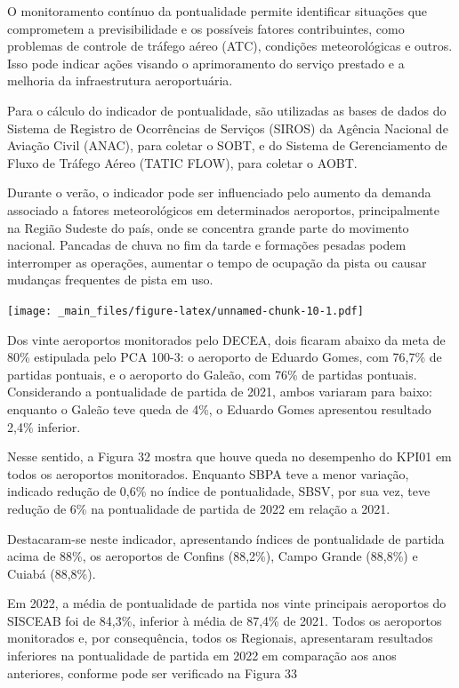 \documentclass[
]{book}
\begin{document}
O monitoramento contínuo da pontualidade permite identificar situações que comprometem a previsibilidade e os possíveis fatores contribuintes, como problemas de controle de tráfego aéreo (ATC), condições meteorológicas e outros. Isso pode indicar ações visando o aprimoramento do serviço prestado e a melhoria da infraestrutura aeroportuária.

Para o cálculo do indicador de pontualidade, são utilizadas as bases de dados do Sistema de Registro de Ocorrências de Serviços (SIROS) da Agência Nacional de Aviação Civil (ANAC), para coletar o SOBT, e do Sistema de Gerenciamento de Fluxo de Tráfego Aéreo (TATIC FLOW), para coletar o AOBT.

Durante o verão, o indicador pode ser influenciado pelo aumento da demanda associado a fatores meteorológicos em determinados aeroportos, principalmente na Região Sudeste do país, onde se concentra grande parte do movimento nacional. Pancadas de chuva no fim da tarde e formações pesadas podem interromper as operações, aumentar o tempo de ocupação da pista ou causar mudanças frequentes de pista em uso.

\texttt{[image: \_main\_files/figure-latex/unnamed-chunk-10-1.pdf]}

Dos vinte aeroportos monitorados pelo DECEA, dois ficaram abaixo da meta de 80\% estipulada pelo PCA 100-3: o aeroporto de Eduardo Gomes, com 76,7\% de partidas pontuais, e o aeroporto do Galeão, com 76\% de partidas pontuais. Considerando a pontualidade de partida de 2021, ambos variaram para baixo: enquanto o Galeão teve queda de 4\%, o Eduardo Gomes apresentou resultado 2,4\% inferior.

Nesse sentido, a Figura 32 mostra que houve queda no desempenho do KPI01 em todos os aeroportos monitorados. Enquanto SBPA teve a menor variação, indicado redução de 0,6\% no índice de pontualidade, SBSV, por sua vez, teve redução de 6\% na pontualidade de partida de 2022 em relação a 2021.

Destacaram-se neste indicador, apresentando índices de pontualidade de partida acima de 88\%, os aeroportos de Confins (88,2\%), Campo Grande (88,8\%) e Cuiabá (88,8\%).

Em 2022, a média de pontualidade de partida nos vinte principais aeroportos do SISCEAB foi de 84,3\%, inferior à média de 87,4\% de 2021. Todos os aeroportos monitorados e, por consequência, todos os Regionais, apresentaram resultados inferiores na pontualidade de partida em 2022 em comparação aos anos anteriores, conforme pode ser verificado na Figura 33
\end{document}
